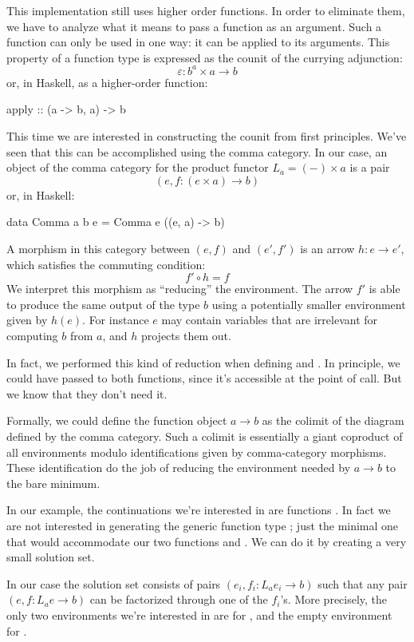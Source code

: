 \documentclass[DaoFP]{subfiles}
\begin{document}
This implementation still uses higher order functions. In order to eliminate them, we have to analyze what it means to pass a function as an argument. Such a function can only be used in one way: it can be applied to its arguments. This property of a function type is expressed as the counit of the currying adjunction:
\[ \varepsilon \colon b^a \times a \to b \]
or, in Haskell, as a higher-order function:
\begin{haskell}
apply :: (a -> b, a) -> b
\end{haskell}
This time we are interested in constructing the counit from first principles. We've seen that this can be accomplished using the comma category. In our case, an object of the comma category for the product functor $L_a = (-) \times a$ is a pair 
\[(e, f \colon (e \times a) \to b) \]
or, in Haskell:
\begin{haskell}
data Comma a b e = Comma e ((e, a) -> b)
\end{haskell}
A morphism in this category between $(e, f)$ and $(e', f')$ is an arrow $h \colon e \to e'$, which satisfies the commuting condition:
\[ f' \circ h = f \]
We interpret this morphism as ``reducing'' the environment. The arrow $f'$ is able to produce the same output of the type $b$ using a potentially smaller environment given by $h (e)$. For instance $e$ may contain variables that are irrelevant for computing $b$ from $a$, and $h$ projects them out. 

In fact, we performed this kind of reduction when defining  and . In principle, we could have passed  to both functions, since it's accessible at the point of call. But we know that they don't need it.

Formally, we could define the function object $a \to b$ as the colimit of the diagram defined by the comma category. Such a colimit is essentially a giant coproduct of all environments modulo identifications given by comma-category morphisms. These identification do the job of reducing the environment needed by $a \to b$ to the bare minimum. 

In our example, the continuations we're interested in are functions . In fact we are not interested in generating the generic function type ; just the minimal one that would accommodate our two functions  and . We can do it by creating a very small solution set. 

In our case the solution set consists of pairs $(e_i, f_i \colon L_a e_i \to b)$ such that any pair $(e, f \colon L_a e \to b)$ can be factorized through one of the $f_i$'s. More precisely, the only two environments we're interested in are  for , and the empty environment \hask{()} for . 
\end{document}
